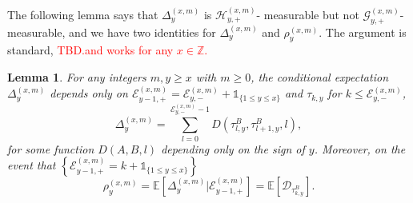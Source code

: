 \documentclass[twoside,12pt,a4paper]{article}
\newtheorem{lemma}{Lemma}[section]
\numberwithin{equation}{section}
\newcommand\TBD{\textcolor{red}{TBD.}}
\newcommand{\edt}[1]{\textcolor{red}{#1}} %
\begin{document}
The following lemma says that $\Delta^{(x,m)}_{y}$ is $\mathcal{H}_{y, +}^{(x,m)}$- measurable but not $\mathcal{G}_{y, +}^{(x,m)}$- measurable, and we have two identities for $\Delta^{(x,m)}_{y}$ and  $\rho_{y}^{(x,m)}$. The argument is standard, \TBD \edt{and works for any $x\in \mathbb{Z}$.}
\begin{lemma}\label{lm: identities for Del, rho} 
	For any integers $m,y\geq x$ with $m\geq 0$, the conditional expectation $\Delta^{(x,m)}_{y}$ depends only on $ \mathcal{E}_{y-1,+}^{(x,m)} = \mathcal{E}_{y,-}^{(x,m)} + \mathbb{1}_{ \{ 1\leq y \leq x \} }$  and $ \tau_{k,y}$ for $k\leq \mathcal{E}^{(x,m)}_{y,-} $,
	\begin{equation} \label{eq: cummulated drift at a site}
		\Delta_{y}^{(x,m)} = \sum_{l=0 }^{ \mathcal{E}^{(x,m)}_{y,-} -1  } D\left(\tau^{B}_{l,y},\tau^{B}_{l+1,y},l \right),
	\end{equation}	
for some function $D(A,B,l)$ depending only on the sign of $y$.
Moreover, on the event that $\left\{\mathcal{E}^{(x,m)}_{y-1,+}  = k + \mathbb{1}_{\{1\leq y\leq x\}}  \right\}$
\begin{equation} \label{eq: conditional mean in GPU represenetation}
	\rho_{y}^{(x,m)} = \mathbb{E}\left[ \Delta_{y}^{(x,m)}\vert \mathcal{E}^{(x,m)}_{y-1,+} \right]	  
	= \mathbb{E}\left[  \mathcal{D}_{\tau^{B}_{k,y}} \right].
\end{equation} 
\end{lemma}  
\end{document}
